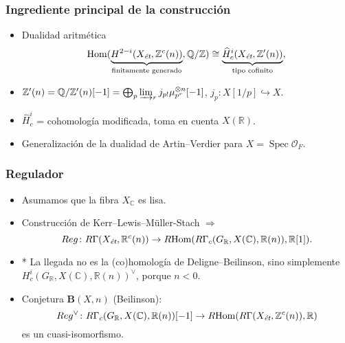 \documentclass[handout]{beamer}
\newcommand{\CC}{\mathbb{C}}
\newcommand{\QQ}{\mathbb{Q}}
\newcommand{\RR}{\mathbb{R}}
\newcommand{\ZZ}{\mathbb{Z}}
\DeclareMathOperator{\Hom}{Hom}
\DeclareMathOperator{\Spec}{Spec}
\newcommand{\et}{\text{\it ét}}
\newcommand{\RHom}{R\!\Hom}
\begin{document}
\begin{frame}
  \frametitle{Ingrediente principal de la construcción}

  \begin{itemize}
  \item<2-> Dualidad aritmética
    \[ \Hom (\underbrace{H^{2-i} (X_\et, \ZZ^c (n))}_{\text{finitamente generado}}, \QQ/\ZZ) \cong
      \underbrace{\widehat{H}^i_c (X_\et, \ZZ' (n))}_{\text{tipo cofinito}}, \]

  \item<3-> $\ZZ' (n) = \QQ/\ZZ' (n) [-1] = \bigoplus_p \varinjlim_r j_{p!} \mu_{p^r}^{\otimes n} [-1]$,
    \quad $j_p\colon X[1/p] \hookrightarrow X$.

  \item<4-> $\widehat{H}^i_c$ = cohomología modificada, toma en cuenta $X (\RR)$.

  \item<5-> Generalización de la dualidad de Artin--Verdier para
    $X = \Spec \mathcal{O}_F$.
  \end{itemize}
\end{frame}


\begin{frame}
  \frametitle{Regulador}

  \begin{itemize}
  \item<2-> Asumamos que la fibra $X_\CC$ es lisa.

  \item<3-> Construcción de Kerr--Lewis--Müller-Stach $\Longrightarrow$
    \[ Reg\colon R\Gamma (X_\et, \RR^c (n)) \to
      \RHom (R\Gamma_c (G_\RR, X(\CC), \RR (n)), \RR[1]). \]

  \item<4-> * La llegada no es la (co)homología de Deligne--Beilinson, sino
    simplemente $H_c^i (G_\RR, X(\CC), \RR (n))^\vee$, porque $n < 0$.

  \item<5-> Conjetura $\mathbf{B} (X,n)$ (Beilinson):
    \[ Reg^\vee\colon R\Gamma_c (G_\RR, X (\CC), \RR (n)) [-1] \to
      \RHom (R\Gamma (X_\et, \ZZ^c (n)), \RR) \]
    es un cuasi-isomorfismo.
  \end{itemize}
\end{frame}

\end{document}
